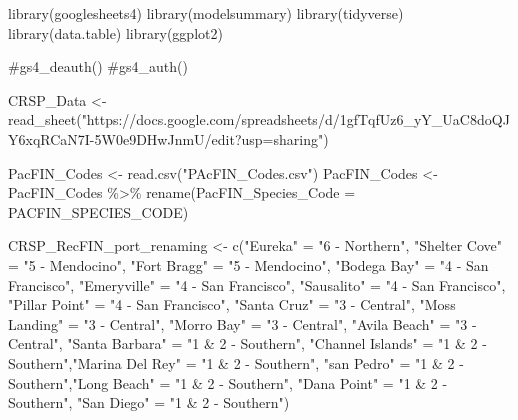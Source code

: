 \documentclass[
  letterpaper,
  DIV=11,
  numbers=noendperiod]{scrartcl}
\newenvironment{Shaded}{\begin{snugshade}}{\end{snugshade}}
\newcommand{\AttributeTok}[1]{\textcolor[rgb]{0.40,0.45,0.13}{#1}}
\newcommand{\CommentTok}[1]{\textcolor[rgb]{0.37,0.37,0.37}{#1}}
\newcommand{\FunctionTok}[1]{\textcolor[rgb]{0.28,0.35,0.67}{#1}}
\newcommand{\NormalTok}[1]{\textcolor[rgb]{0.00,0.23,0.31}{#1}}
\newcommand{\OtherTok}[1]{\textcolor[rgb]{0.00,0.23,0.31}{#1}}
\newcommand{\SpecialCharTok}[1]{\textcolor[rgb]{0.37,0.37,0.37}{#1}}
\newcommand{\StringTok}[1]{\textcolor[rgb]{0.13,0.47,0.30}{#1}}
\begin{document}
\begin{Shaded}
\begin{Highlighting}[]
\FunctionTok{library}\NormalTok{(googlesheets4)}
\FunctionTok{library}\NormalTok{(modelsummary)}
\FunctionTok{library}\NormalTok{(tidyverse)}
\FunctionTok{library}\NormalTok{(data.table)}
\FunctionTok{library}\NormalTok{(ggplot2)}

\CommentTok{\#gs4\_deauth()}
\CommentTok{\#gs4\_auth()}

\NormalTok{CRSP\_Data }\OtherTok{\textless{}{-}} \FunctionTok{read\_sheet}\NormalTok{(}\StringTok{"https://docs.google.com/spreadsheets/d/1gfTqfUz6\_yY\_UaC8doQJY6xqRCaN7I{-}5W0e9DHwJnmU/edit?usp=sharing"}\NormalTok{)}

\NormalTok{PacFIN\_Codes }\OtherTok{\textless{}{-}} \FunctionTok{read.csv}\NormalTok{(}\StringTok{"PAcFIN\_Codes.csv"}\NormalTok{)}
\NormalTok{PacFIN\_Codes }\OtherTok{\textless{}{-}}\NormalTok{ PacFIN\_Codes }\SpecialCharTok{\%\textgreater{}\%} 
  \FunctionTok{rename}\NormalTok{(}\AttributeTok{PacFIN\_Species\_Code =}\NormalTok{ PACFIN\_SPECIES\_CODE)}

\NormalTok{CRSP\_RecFIN\_port\_renaming }\OtherTok{\textless{}{-}} \FunctionTok{c}\NormalTok{(}\StringTok{"Eureka"} \OtherTok{=} \StringTok{"6 {-} Northern"}\NormalTok{, }\StringTok{"Shelter Cove"} \OtherTok{=} \StringTok{"5 {-} Mendocino"}\NormalTok{, }\StringTok{"Fort Bragg"} \OtherTok{=} \StringTok{"5 {-} Mendocino"}\NormalTok{, }\StringTok{"Bodega Bay"} \OtherTok{=} \StringTok{"4 {-} San Francisco"}\NormalTok{, }\StringTok{"Emeryville"} \OtherTok{=} \StringTok{"4 {-} San Francisco"}\NormalTok{, }\StringTok{"Sausalito"} \OtherTok{=} \StringTok{"4 {-} San Francisco"}\NormalTok{, }\StringTok{"Pillar Point"} \OtherTok{=} \StringTok{"4 {-} San Francisco"}\NormalTok{, }\StringTok{"Santa Cruz"} \OtherTok{=} \StringTok{"3 {-} Central"}\NormalTok{, }\StringTok{"Moss Landing"} \OtherTok{=} \StringTok{"3 {-} Central"}\NormalTok{, }\StringTok{"Morro Bay"} \OtherTok{=} \StringTok{"3 {-} Central"}\NormalTok{, }\StringTok{"Avila Beach"} \OtherTok{=} \StringTok{"3 {-} Central"}\NormalTok{, }\StringTok{"Santa Barbara"} \OtherTok{=} \StringTok{"1 \& 2 {-} Southern"}\NormalTok{, }\StringTok{"Channel Islands"} \OtherTok{=} \StringTok{"1 \& 2 {-} Southern"}\NormalTok{,}\StringTok{"Marina Del Rey"} \OtherTok{=} \StringTok{"1 \& 2 {-} Southern"}\NormalTok{, }\StringTok{"san Pedro"} \OtherTok{=} \StringTok{"1 \& 2 {-} Southern"}\NormalTok{,}\StringTok{"Long Beach"} \OtherTok{=} \StringTok{"1 \& 2 {-} Southern"}\NormalTok{, }\StringTok{"Dana Point"} \OtherTok{=} \StringTok{"1 \& 2 {-} Southern"}\NormalTok{, }\StringTok{"San Diego"} \OtherTok{=} \StringTok{"1 \& 2 {-} Southern"}\NormalTok{)}


\end{Highlighting}
\end{Shaded}
\end{document}
